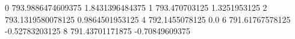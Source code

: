 0 793.9886474609375 1.8431396484375
1 793.470703125 1.3251953125
2 793.1319580078125 0.9864501953125
4 792.1455078125 0.0
6 791.61767578125 -0.52783203125
8 791.43701171875 -0.70849609375
